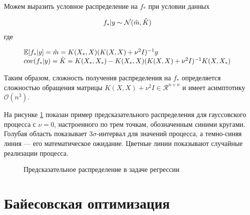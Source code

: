 Можем выразить условное распределение на $f_*$ при условии данных

$$
 f_* \arrowvert y \sim \mathcal{N}(\hat{m}, \hat{K})
$$
где

\begin{equation} 
	\begin{array}{r@{}l} \label{eq:18}
		&{} \mathbb{E} [f_* \arrowvert y] = \hat{m} = K(X_*, X) (K(X, X) + \nu^2 I)^{-1} y\\
		&{} cov(f_* \arrowvert y) = \hat{K} = K(X_*, X_*) - K(X_*,  X) (K(X, X) + \nu^2 I)^{-1} K(X, X_{*}) \\
	\end{array}{}
\end{equation}

Таким образом, сложность получения распределения на $f_*$ определяется сложностью обращения матрицы $K(X, X) + \nu^2 I \in \mathcal{R}^{n \times n}$ и имеет асимптотику $\mathcal{O}(n^3)$.

На рисунке \ref{fig:predict_gauss_proc} показан пример предсказательного распределения для гауссовского процесса с $\nu = 0$, настроенного по трем точкам, обозначенным синими кругами. Голубая область показывает $3\sigma$-интервал для значений процесса, а темно-синяя линия — его математическое ожидание. Цветные линии показывают случайные реализации процесса.

\begin{figure}[H]
	\captionsetup{justification=centering}
	\caption{Предсказательное распределение в задаче регрессии}
	\label{fig:predict_gauss_proc}
\end{figure}

\section{Байесовская оптимизация}


